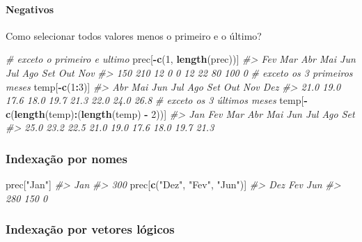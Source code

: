 \documentclass[]{book}
\newenvironment{Shaded}{\begin{snugshade}}{\end{snugshade}}
\newcommand{\KeywordTok}[1]{\textcolor[rgb]{0.13,0.29,0.53}{\textbf{#1}}}
\newcommand{\DecValTok}[1]{\textcolor[rgb]{0.00,0.00,0.81}{#1}}
\newcommand{\StringTok}[1]{\textcolor[rgb]{0.31,0.60,0.02}{#1}}
\newcommand{\CommentTok}[1]{\textcolor[rgb]{0.56,0.35,0.01}{\textit{#1}}}
\newcommand{\OperatorTok}[1]{\textcolor[rgb]{0.81,0.36,0.00}{\textbf{#1}}}
\newcommand{\NormalTok}[1]{#1}
\let\oldparagraph\paragraph
\renewcommand{\paragraph}[1]{\oldparagraph{#1}\mbox{}}
\begin{document}
\paragraph{Negativos}\label{negativos}

Como selecionar todos valores menos o primeiro e o último?

\begin{Shaded}
\begin{Highlighting}[]
\CommentTok{# exceto o primeiro e ultimo}
\NormalTok{prec[}\OperatorTok{-}\KeywordTok{c}\NormalTok{(}\DecValTok{1}\NormalTok{, }\KeywordTok{length}\NormalTok{(prec))]}
\CommentTok{#> Fev Mar Abr Mai Jun Jul Ago Set Out Nov }
\CommentTok{#> 150 210  12   0   0  12  22  80 100   0}
\CommentTok{# exceto os 3 primeiros meses}
\NormalTok{temp[}\OperatorTok{-}\KeywordTok{c}\NormalTok{(}\DecValTok{1}\OperatorTok{:}\DecValTok{3}\NormalTok{)]}
\CommentTok{#>  Abr  Mai  Jun  Jul  Ago  Set  Out  Nov  Dez }
\CommentTok{#> 21.0 19.0 17.6 18.0 19.7 21.3 22.0 24.0 26.8}
\CommentTok{# exceto os 3 últimos meses}
\NormalTok{temp[}\OperatorTok{-}\KeywordTok{c}\NormalTok{(}\KeywordTok{length}\NormalTok{(temp)}\OperatorTok{:}\NormalTok{(}\KeywordTok{length}\NormalTok{(temp) }\OperatorTok{-}\StringTok{ }\DecValTok{2}\NormalTok{))]}
\CommentTok{#>  Jan  Fev  Mar  Abr  Mai  Jun  Jul  Ago  Set }
\CommentTok{#> 25.0 23.2 22.5 21.0 19.0 17.6 18.0 19.7 21.3}
\end{Highlighting}
\end{Shaded}

\subsubsection{Indexação por nomes}\label{indexacao-por-nomes}

\begin{Shaded}
\begin{Highlighting}[]
\NormalTok{prec[}\StringTok{"Jan"}\NormalTok{]}
\CommentTok{#> Jan }
\CommentTok{#> 300}
\NormalTok{prec[}\KeywordTok{c}\NormalTok{(}\StringTok{"Dez"}\NormalTok{, }\StringTok{"Fev"}\NormalTok{, }\StringTok{"Jun"}\NormalTok{)]}
\CommentTok{#> Dez Fev Jun }
\CommentTok{#> 280 150   0}
\end{Highlighting}
\end{Shaded}

\subsubsection{Indexação por vetores
lógicos}\label{indexacao-por-vetores-logicos}
\end{document}
